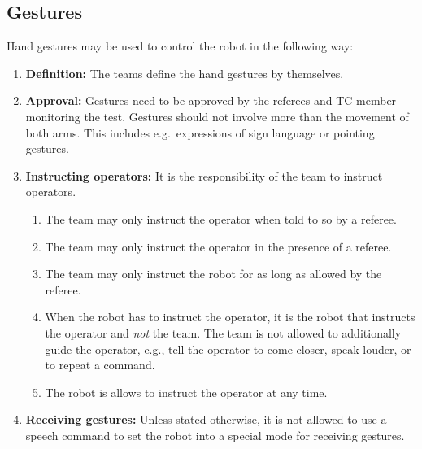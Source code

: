 \subsection{Gestures}
\label{rule:gestures}
Hand gestures may be used to control the robot in the following way:
\begin{enumerate}
	\item \textbf{Definition:} The teams define the hand gestures by themselves.
	\item \textbf{Approval:} Gestures need to be approved by the referees and TC member monitoring the test. Gestures should not involve more than the movement of both arms. This includes e.g.~expressions of sign language or pointing gestures.
	\item \textbf{Instructing operators:} It is the responsibility of the team to instruct operators.
	\begin{enumerate}
		\item The team may only instruct the operator when told to so by a referee.
		\item The team may only instruct the operator in the presence of a referee.
		\item The team may only instruct the robot for as long as allowed by the referee.
		\item When the robot has to instruct the operator, it is the robot that instructs the operator and \emph{not} the team. The team is not allowed to additionally guide the operator, e.g., tell the operator to come closer, speak louder, or to repeat a command.
		\item The robot is allows to instruct the operator at any time.
	\end{enumerate}
	\item \textbf{Receiving gestures:} Unless stated otherwise, it is not allowed to use a speech command to set the robot into a special mode for receiving gestures.
\end{enumerate}



